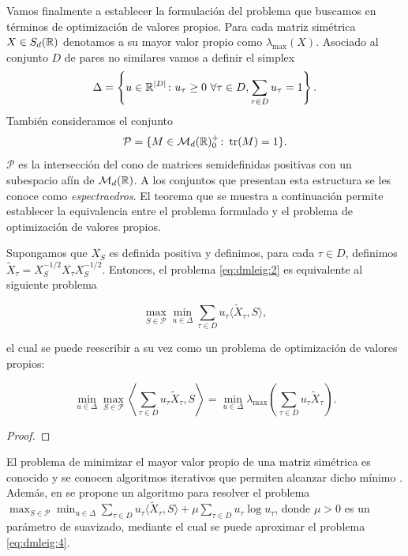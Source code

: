 Vamos finalmente a establecer la formulación del problema que buscamos en términos de optimización de valores propios. Para cada matriz simétrica $X \in S_d(\mathbb{R})$ denotamos a su mayor valor propio como $\lambda_{\max}(X)$. Asociado al conjunto $D$ de pares no similares vamos a definir el simplex
\[ \Delta = \left\{u \in \mathbb{R}^{|D|} \colon u_\tau \ge 0 \ \forall \tau \in D, \sum_{\tau \in D} u_{\tau} = 1 \right\}. \]
También consideramos el conjunto
\[ \mathcal{P} = \{M \in \mathcal{M}_d(\mathbb{R})^+_0 \colon \operatorname{tr}(M) = 1 \}.  \]
$\mathcal{P}$ es la intersección del cono de matrices semidefinidas positivas con un subespacio afín de $\mathcal{M}_d(\mathbb{R})$. A los conjuntos que presentan esta estructura se les conoce como \emph{espectraedros}. El teorema que se muestra a continuación permite establecer la equivalencia entre el problema formulado y el problema de optimización de valores propios.

\begin{thm}
    Supongamos que $X_S$ es definida positiva y definimos, para cada $\tau \in D$, definimos $\widetilde{X}_{\tau} = X_S^{-1/2}X_{\tau}X_S^{-1/2}$. Entonces, el problema \ref{eq:dmleig:2} es equivalente al siguiente problema

    \begin{equation} \label{eq:dmleig:3}
        \max_{S \in \mathcal{P}} \min_{u \in \Delta} \sum_{\tau \in D} u_{\tau}\langle \widetilde{X}_{\tau},S\rangle,
    \end{equation}

    el cual se puede reescribir a su vez como un problema de optimización de valores propios:

    \begin{equation} \label{eq:dmleig:4}
        \min_{u \in \Delta} \max_{S \in \mathcal{P}} \left\langle \sum_{\tau \in D} u_{\tau} \widetilde{X}_{\tau},S\right\rangle = \min_{u \in \Delta} \lambda_{\max}\left( \sum_{\tau\in D}u_{\tau}\widetilde{X}_{\tau} \right).
    \end{equation}
\end{thm}

\begin{proof}

\end{proof}

El problema de minimizar el mayor valor propio de una matriz simétrica es conocido y se conocen algoritmos iterativos que permiten alcanzar dicho mínimo \cite{overton1988minimizing}. Además, en \cite{dmleig} se propone un algoritmo para resolver el problema $\max_{S \in \mathcal{P}} \min_{u \in \Delta} \sum_{\tau \in D} u_{\tau}\langle \widetilde{X}_{\tau},S\rangle + \mu \sum_{\tau \in D} u_{\tau} \log u_{\tau}$, donde $\mu > 0$ es un parámetro de suavizado, mediante el cual se puede aproximar el problema \ref{eq:dmleig:4}.

